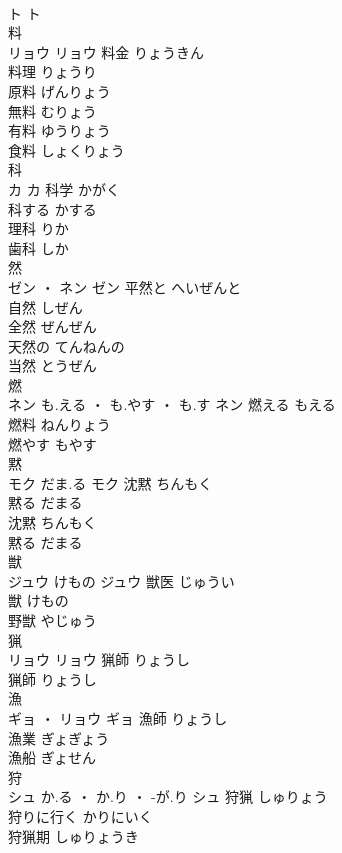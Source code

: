 \documentclass[8pt]{extreport}
\begin{document}
\begin{CJK}{UTF8}{min}
\\	ト		ト																																			
\\	料	
\\	リョウ		リョウ	料金	りょうきん	
\\	料理	りょうり	
\\	原料	げんりょう	
\\	無料	むりょう	
\\	有料	ゆうりょう	
\\	食料	しょくりょう	
\\	科	
\\	カ		カ	科学	かがく	
\\	科する	かする	
\\	理科	りか	
\\	歯科	しか	
\\	然	
\\	ゼン ・ ネン		ゼン	平然と	へいぜんと	
\\	自然	しぜん	
\\	全然	ぜんぜん	
\\	天然の	てんねんの	
\\	当然	とうぜん	
\\	燃	
\\	ネン	も.える ・ も.やす ・ も.す	ネン	燃える	もえる	
\\	燃料	ねんりょう	
\\	燃やす	もやす	
\\	黙	
\\	モク	だま.る	モク	沈黙	ちんもく	
\\	黙る	だまる	
\\	沈黙	ちんもく	
\\	黙る	だまる	
\\	獣	
\\	ジュウ	けもの	ジュウ	獣医	じゅうい	
\\	獣	けもの	
\\	野獣	やじゅう	
\\	猟	
\\	リョウ		リョウ	猟師	りょうし	
\\	猟師	りょうし	
\\	漁	
\\	ギョ ・ リョウ		ギョ	漁師	りょうし	
\\	漁業	ぎょぎょう	
\\	漁船	ぎょせん	
\\	狩	
\\	シュ	か.る ・ か.り ・ -が.り	シュ	狩猟	しゅりょう	
\\	狩りに行く	かりにいく	
\\	狩猟期	しゅりょうき	

\end{CJK}
\end{document}
